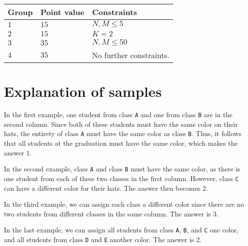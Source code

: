 \noindent
\begin{tabular}{| l | l | p{12cm} |}
  \hline
  \textbf{Group} & \textbf{Point value} & \textbf{Constraints} \\ \hline
  $1$    & $15$    & $N, M \leq 5 $ \\ \hline
  $2$    & $15$    & $K = 2$ \\ \hline
  $3$    & $35$    & $N, M \leq 50 $ \\ \hline
  $4$    & $35$    & No further constraints. \\ \hline
\end{tabular}


\section*{Explanation of samples}
In the first example, one student from class \texttt{A} and one from class \texttt{B} are in the second column.
Since both of these students must have the same color on their hats, the entirety of class \texttt{A}
must have the same color as class \texttt{B}. Thus, it follows that all students at the
graduation must have the same color, which makes the answer $1$.

In the second example, class \texttt{A} and class \texttt{B} must have the same color, as there is one student
from each of these two classes in the first column. However, class \texttt{C} can have a different color for their hats.
The answer then becomes $2$.

In the third example, we can assign each class a different color since there are no two students from different
classes in the same column. The answer is $3$.

In the last example, we can assign all students from class \texttt{A}, \texttt{B}, and \texttt{C} one color,
and all students from class \texttt{D} and \texttt{E} another color. The answer is $2$.